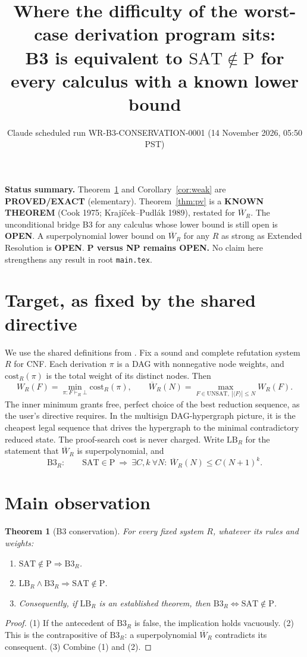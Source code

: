 \documentclass[11pt]{article}
\title{Where the difficulty of the worst-case derivation program sits:\\
B3 is equivalent to $\mathrm{SAT}\notin\mathrm{P}$ for every calculus with a known lower bound}
\author{Claude scheduled run WR-B3-CONSERVATION-0001 (14 November 2026, 05:50 PST)}
\date{}
\newtheorem{theorem}{Theorem}
\theoremstyle{definition}
\newcommand{\Wbar}{\overline W}
\begin{document}
\maketitle

\noindent\textbf{Status summary.}
Theorem~\ref{thm:conservation} and Corollary~\ref{cor:weak} are \textbf{PROVED/EXACT} (elementary).
Theorem~\ref{thm:pv} is a \textbf{KNOWN THEOREM} (Cook 1975; Krajíček--Pudlák 1989), restated for $\Wbar_R$.
The unconditional bridge B3 for any calculus whose lower bound is still open is \textbf{OPEN}.
A superpolynomial lower bound on $\Wbar_R$ for any $R$ as strong as Extended Resolution is \textbf{OPEN}.
\textbf{P versus NP remains OPEN.}
No claim here strengthens any result in root \texttt{main.tex}.

\section{Target, as fixed by the shared directive}
We use the shared definitions from
.
Fix a sound and complete refutation system $R$ for CNF.
Each derivation $\pi$ is a DAG with nonnegative node weights, and $\mathrm{cost}_R(\pi)$ is the total weight of its distinct nodes.
Then
\[
W_R(F)=\min_{\pi:F\vdash_R\bot}\mathrm{cost}_R(\pi),\qquad
\Wbar_R(N)=\max_{F\in\mathrm{UNSAT},\ |\langle F\rangle|\le N}W_R(F).
\]
The inner minimum grants free, perfect choice of the best reduction sequence, as the user's directive requires.
In the multisign DAG-hypergraph picture, it is the cheapest legal sequence that drives the hypergraph to the minimal contradictory reduced state.
The proof-search cost is never charged.
Write $\mathrm{LB}_R$ for the statement that $\Wbar_R$ is superpolynomial, and
\[
\mathrm{B3}_R:\qquad \mathrm{SAT}\in\mathrm{P}\ \Longrightarrow\ \exists C,k\ \forall N:\ \Wbar_R(N)\le C(N+1)^k .
\]

\section{Main observation}
\begin{theorem}[B3 conservation]\label{thm:conservation}
For every fixed system $R$, whatever its rules and weights:
\begin{enumerate}
\item $\mathrm{SAT}\notin\mathrm{P}\Rightarrow \mathrm{B3}_R$.
\item $\mathrm{LB}_R\wedge\mathrm{B3}_R\Rightarrow\mathrm{SAT}\notin\mathrm{P}$.
\item Consequently, if $\mathrm{LB}_R$ is an established theorem, then $\mathrm{B3}_R\Longleftrightarrow \mathrm{SAT}\notin\mathrm{P}$.
\end{enumerate}
\end{theorem}
\begin{proof}
(1) If the antecedent of $\mathrm{B3}_R$ is false, the implication holds vacuously.
(2) This is the contrapositive of $\mathrm{B3}_R$: a superpolynomial $\Wbar_R$ contradicts its consequent.
(3) Combine (1) and (2).
\end{proof}
\end{document}
